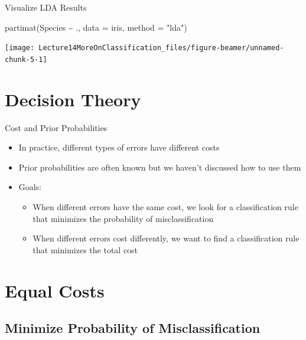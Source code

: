 \documentclass[
  ignorenonframetext,
]{beamer}
\newenvironment{Shaded}{\begin{snugshade}}{\end{snugshade}}
\newcommand{\AttributeTok}[1]{\textcolor[rgb]{0.77,0.63,0.00}{#1}}
\newcommand{\FunctionTok}[1]{\textcolor[rgb]{0.00,0.00,0.00}{#1}}
\newcommand{\NormalTok}[1]{#1}
\newcommand{\SpecialCharTok}[1]{\textcolor[rgb]{0.00,0.00,0.00}{#1}}
\newcommand{\StringTok}[1]{\textcolor[rgb]{0.31,0.60,0.02}{#1}}
\providecommand{\tightlist}{%
  \setlength{\itemsep}{0pt}\setlength{\parskip}{0pt}}
\begin{document}
\begin{frame}[fragile]{Visualize LDA Results}
\protect\hypertarget{visualize-lda-results}{}
\begin{Shaded}
\begin{Highlighting}[]
\FunctionTok{partimat}\NormalTok{(Species }\SpecialCharTok{\textasciitilde{}}\NormalTok{ ., }\AttributeTok{data =}\NormalTok{ iris, }\AttributeTok{method =} \StringTok{"lda"}\NormalTok{)}
\end{Highlighting}
\end{Shaded}

\texttt{[image: Lecture14MoreOnClassification\_files/figure-beamer/unnamed-chunk-5-1]}
\end{frame}

\hypertarget{decision-theory}{%
\section{Decision Theory}\label{decision-theory}}

\begin{frame}{Cost and Prior Probabilities}
\protect\hypertarget{cost-and-prior-probabilities}{}
\begin{itemize}
\tightlist
\item
  In practice, different types of errors have different costs
\item
  Prior probabilities are often known but we haven't discussed how to
  use them
\item
  Goals:

  \begin{itemize}
  \tightlist
  \item
    When different errors have the same cost, we look for a
    classification rule that minimizes the probability of
    misclassification\\
  \item
    When different errors cost differently, we want to find a
    classification rule that minimizes the total cost
  \end{itemize}
\end{itemize}
\end{frame}

\hypertarget{equal-costs}{%
\section{Equal Costs}\label{equal-costs}}

\hypertarget{minimize-probability-of-misclassification}{%
\subsection{Minimize Probability of
Misclassification}\label{minimize-probability-of-misclassification}}
\end{document}
